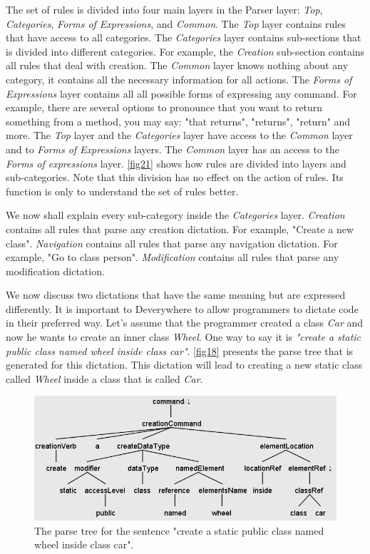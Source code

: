 The set of rules is divided into four main layers in the Parser layer: \textit{Top}, \textit{Categories}, \textit{Forms of Expressions}, and \textit{Common}. The \textit{Top} layer contains rules that have access to all categories. The \textit{Categories} layer contains sub-sections that is divided into different categories. For example, the \textit{Creation} sub-section contains all rules that deal with creation. The \textit{Common} layer knows nothing about any category, it contains all the necessary information for all actions. The \textit{Forms of Expressions} layer contains all all possible forms of expressing any command. For example, there are several options to pronounce that you want to return something from a method, you may say: "that returns", "returns", "return" and more. The \textit{Top} layer and the \textit{Categories} layer have access to the \textit{Common} layer and to \textit{Forms of Expressions} layers. The \textit{Common} layer has an access to the \textit{Forms of expressions} layer. \autoref{fig21} shows how rules are divided into layers and sub-categories. Note that this division has no effect on the action of rules. Its function is only to understand the set of rules better.

We now shall explain every sub-category inside the \textit{Categories} layer. \textit{Creation} contains all rules that parse any creation dictation. For example, "Create a new class". \textit{Navigation} contains all rules that parse any navigation dictation. For example, "Go to class person". \textit{Modification} contains all rules that parse any modification dictation.

We now discuss two dictations that have the same meaning but are expressed differently. It is important to Deverywhere to allow programmers to dictate code in their preferred way. Let’s assume that the programmer created a class \textit{Car} and now he wants to create an inner class \textit{Wheel}. One way to say it is \textit{"create a static public class named wheel inside class car"}. \autoref{fig18} presents the parse tree that is generated for this dictation. This dictation will lead to creating a new static class called \textit{Wheel} inside a class that is called \textit{Car}.   

\begin{figure}[H]
	\centering
	\includegraphics[scale=0.4]{"./fig/Parse Tree create a static public class named wheel inside class car"}
	\caption{The parse tree for the sentence "create a static public class named wheel inside class car".}
	\label{fig18}
\end{figure}

